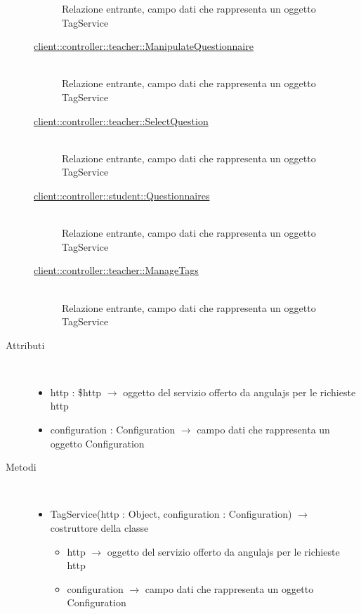 \begin{description}
\begin{description}
	Relazione entrante, campo dati che rappresenta un oggetto TagService
	\item[\hyperlink{client::controller::teacher::ManipulateQuestionnaire}{client::controller::teacher::ManipulateQuestionnaire}] \hfill \\
	Relazione entrante, campo dati che rappresenta un oggetto TagService
	\item[\hyperlink{client::controller::teacher::SelectQuestion}{client::controller::teacher::SelectQuestion}] \hfill \\
	Relazione entrante, campo dati che rappresenta un oggetto TagService
	\item[\hyperlink{client::controller::student::Questionnaires}{client::controller::student::Questionnaires}] \hfill \\
	Relazione entrante, campo dati che rappresenta un oggetto TagService
	\item[\hyperlink{client::controller::teacher::ManageTags}{client::controller::teacher::ManageTags}] \hfill \\
	Relazione entrante, campo dati che rappresenta un oggetto TagService
\end{description}

\item[Attributi] \hfill \\
\vspace{-7mm}
\begin{itemize}
	\item http : \$http $\rightarrow$ oggetto del servizio offerto da angulajs per le richieste http
	\item configuration : Configuration $\rightarrow$ campo dati che rappresenta un oggetto Configuration
\end{itemize}

\item[Metodi] \hfill \\
\vspace{-7mm}
\begin{itemize}
	\item TagService(http : Object, configuration : Configuration) $\rightarrow$ costruttore della classe\begin{itemize}
		\item http $\rightarrow$ oggetto del servizio offerto da angulajs per le richieste http
		\item configuration $\rightarrow$ campo dati che rappresenta un oggetto Configuration
	\end{itemize}
	

\end{itemize}
\end{description}

